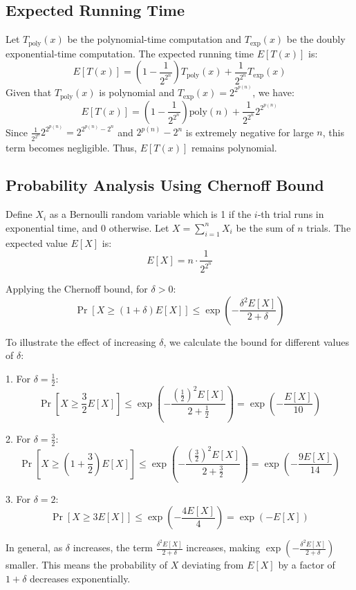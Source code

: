 \documentclass{article}
\begin{document}
\subsection*{Expected Running Time}

Let \(T_{\text{poly}}(x)\) be the polynomial-time computation and \(T_{\text{exp}}(x)\) be the doubly exponential-time computation. The expected running time \(E[T(x)]\) is:
\[
E[T(x)] = \left(1 - \frac{1}{2^{2^n}}\right) T_{\text{poly}}(x) + \frac{1}{2^{2^n}} T_{\text{exp}}(x)
\]
Given that \(T_{\text{poly}}(x)\) is polynomial and \(T_{\text{exp}}(x) = 2^{2^{p(n)}}\), we have:
\[
E[T(x)] = \left(1 - \frac{1}{2^{2^n}}\right) \text{poly}(n) + \frac{1}{2^{2^n}} 2^{2^{p(n)}}
\]
Since \(\frac{1}{2^{2^n}} 2^{2^{p(n)}} = 2^{2^{p(n)} - 2^n}\) and \(2^{p(n)} - 2^n\) is extremely negative for large \(n\), this term becomes negligible. Thus, \(E[T(x)]\) remains polynomial.

\subsection*{Probability Analysis Using Chernoff Bound}

Define \(X_i\) as a Bernoulli random variable which is 1 if the \(i\)-th trial runs in exponential time, and 0 otherwise. Let \(X = \sum_{i=1}^n X_i\) be the sum of \(n\) trials. The expected value \(E[X]\) is:
\[
E[X] = n \cdot \frac{1}{2^{2^n}}
\]

Applying the Chernoff bound, for \(\delta > 0\):
\[
\Pr[X \geq (1+\delta)E[X]] \leq \exp\left(-\frac{\delta^2 E[X]}{2 + \delta}\right)
\]

To illustrate the effect of increasing \(\delta\), we calculate the bound for different values of \(\delta\):

1. For \(\delta = \frac{1}{2}\):
   \[
   \Pr[X \geq \frac{3}{2}E[X]] \leq \exp\left(-\frac{\left(\frac{1}{2}\right)^2 E[X]}{2 + \frac{1}{2}}\right) = \exp\left(-\frac{E[X]}{10}\right)
   \]

2. For \(\delta = \frac{3}{2}\):
   \[
   \Pr\left[X \geq \left(1 + \frac{3}{2}\right) E[X]\right] \leq \exp\left(-\frac{\left(\frac{3}{2}\right)^2 E[X]}{2 + \frac{3}{2}}\right) = \exp\left(-\frac{9 E[X]}{14}\right)
   \]

3. For \(\delta = 2\):
   \[
   \Pr[X \geq 3E[X]] \leq \exp\left(-\frac{4E[X]}{4}\right) = \exp\left(-E[X]\right)
   \]

In general, as \(\delta\) increases, the term \(\frac{\delta^2 E[X]}{2 + \delta}\) increases, making \(\exp\left(-\frac{\delta^2 E[X]}{2 + \delta}\right)\) smaller. This means the probability of \(X\) deviating from \(E[X]\) by a factor of \(1 + \delta\) decreases exponentially.
\end{document}
